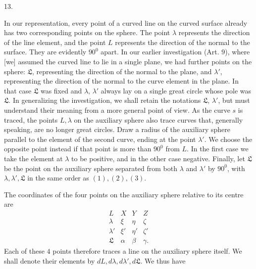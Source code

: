 %
\begin{center}13.\end{center}
\noindent\hspace*{1.2em}In our representation, every point of a curved line on the curved surface already has two corresponding points on the sphere. The point $\lambda$ represents the direction of the line element, and the point $L$ represents the direction of the normal to the surface. They are evidently $90^{0}$ apart. In our earlier investigation (Art. $9$), where [we] assumed the curved line to lie in a single plane, we had  further points on the sphere: $\mathfrak{L}$, representing the direction of the normal to the plane, and $\lambda'$, representing the direction of the normal to the curve element in the plane. In that case $\mathfrak{L}$ was fixed and $\lambda$, $\lambda'$ always lay on a single great circle whose pole was $\mathfrak{L}$. In generalizing the investigation, we shall retain the notations $\mathfrak{L}$, $\lambda'$, but must understand their meaning from a more general point of view. As the curve $s$ is traced, the points $L,\lambda$ on the auxiliary sphere also trace curves that, generally speaking, are no longer great circles. Draw a radius of the auxiliary sphere parallel to the element of the second curve, ending at the point $\lambda'$. We choose the opposite point instead if that point is more than $90^{0}$ from $L$. In the first case we take the element at $\lambda$ to be positive, and in the other case negative. Finally, let $\mathfrak{L}$ be the point on the auxiliary sphere separated from both $\lambda$ and $\lambda'$ by $90^{0}$, with $\lambda,\lambda',\mathfrak{L}$ in the same order as $(1),(2),(3)$.

The coordinates of the four points on the auxiliary sphere relative to its centre are
\[
\begin{array}{cccc}
L&X&Y&Z\\
\lambda&\xi&\eta&\zeta\\
\lambda'&\xi'&\eta'&\zeta'\\
\mathfrak{L}&\alpha&\beta&\gamma.
\end{array}
\]
Each of these $4$ points therefore traces a line on the auxiliary sphere itself. We shall denote their elements by $dL,d\lambda,d\lambda',d\mathfrak{L}$. We thus have
